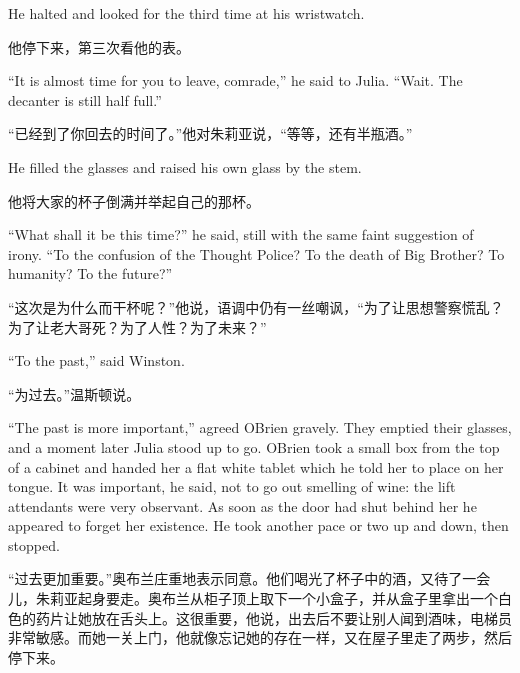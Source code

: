 \begin{paracol}{2}
\switchcolumn*

He halted and looked for the third time at his wristwatch.

\switchcolumn

他停下来，第三次看他的表。

\switchcolumn*

``It is almost time for you to leave, comrade,'' he said to Julia. ``Wait.
The decanter is still half full.''

\switchcolumn

``已经到了你回去的时间了。''他对朱莉亚说，``等等，还有半瓶酒。''

\switchcolumn*

He filled the glasses and raised his own glass by the stem.

\switchcolumn

他将大家的杯子倒满并举起自己的那杯。

\switchcolumn*

``What shall it be this time?'' he said, still with the same faint
suggestion of irony. ``To the confusion of the Thought Police? To the
death of Big Brother? To humanity? To the future?''

\switchcolumn

``这次是为什么而干杯呢？''他说，语调中仍有一丝嘲讽，``为了让思想警察慌乱？为了让老大哥死？为了人性？为了未来？''

\switchcolumn*

``To the past,'' said Winston.

\switchcolumn

``为过去。''温斯顿说。

\switchcolumn*

``The past is more important,'' agreed O\textquotesingle Brien gravely.
They emptied their glasses, and a moment later Julia stood up to go.
O\textquotesingle Brien took a small box from the top of a cabinet and
handed her a flat white tablet which he told her to place on her tongue.
It was important, he said, not to go out smelling of wine: the lift
attendants were very observant. As soon as the door had shut behind her
he appeared to forget her existence. He took another pace or two up and
down, then stopped.

\switchcolumn

``过去更加重要。''奥布兰庄重地表示同意。他们喝光了杯子中的酒，又待了一会儿，朱莉亚起身要走。奥布兰从柜子顶上取下一个小盒子，并从盒子里拿出一个白色的药片让她放在舌头上。这很重要，他说，出去后不要让别人闻到酒味，电梯员非常敏感。而她一关上门，他就像忘记她的存在一样，又在屋子里走了两步，然后停下来。


\end{paracol}
